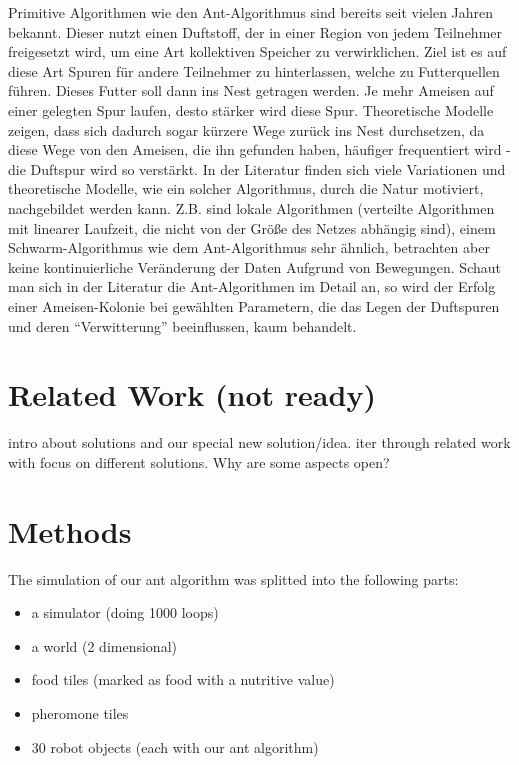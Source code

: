 Primitive Algorithmen wie den Ant-Algorithmus sind bereits seit vielen
Jahren bekannt. Dieser nutzt einen Duftstoff, der in einer Region von
jedem Teilnehmer freigesetzt wird, um eine Art kollektiven Speicher zu
verwirklichen. Ziel ist es auf diese Art Spuren für andere Teilnehmer zu
hinterlassen, welche zu Futterquellen führen. Dieses Futter soll dann
ins Nest getragen werden. Je mehr Ameisen auf einer gelegten Spur
laufen, desto stärker wird diese Spur. Theoretische Modelle zeigen, dass
sich dadurch sogar kürzere Wege zurück ins Nest durchsetzen, da diese
Wege von den Ameisen, die ihn gefunden haben, häufiger frequentiert wird
- die Duftspur wird so verstärkt. In der Literatur finden sich viele
Variationen und theoretische Modelle, wie ein solcher Algorithmus, durch
die Natur motiviert, nachgebildet werden kann. Z.B. sind lokale
Algorithmen (verteilte Algorithmen mit linearer Laufzeit, die nicht von
der Größe des Netzes abhängig sind), einem Schwarm-Algorithmus wie dem
Ant-Algorithmus sehr ähnlich, betrachten aber keine kontinuierliche
Veränderung der Daten Aufgrund von Bewegungen. Schaut man sich in der
Literatur die Ant-Algorithmen im Detail an, so wird der Erfolg einer
Ameisen-Kolonie bei gewählten Parametern, die das Legen der Duftspuren
und deren ``Verwitterung'' beeinflussen, kaum behandelt.

\section{Related Work (not ready)}\label{related-work-not-ready}

intro about solutions and our special new solution/idea. iter through
related work with focus on different solutions. Why are some aspects
open?

\section{Methods}\label{methods}

The simulation of our ant algorithm was splitted into the following
parts:

\begin{itemize}
\tightlist
\item
  a simulator (doing 1000 loops)
\item
  a world (2 dimensional)
\item
  food tiles (marked as food with a nutritive value)
\item
  pheromone tiles
\item
  30 robot objects (each with our ant algorithm)
\end{itemize}

